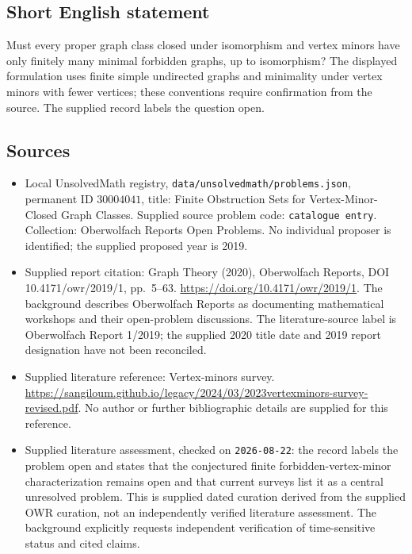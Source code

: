 \documentclass[11pt]{article}
\begin{document}
\subsection{Short English statement}
Must every proper graph class closed under isomorphism and vertex minors have only finitely many minimal forbidden graphs, up to isomorphism? The displayed formulation uses finite simple undirected graphs and minimality under vertex minors with fewer vertices; these conventions require confirmation from the source. The supplied record labels the question open.
\subsection{Sources}
\begin{itemize}
\item Local UnsolvedMath registry, \texttt{data/unsolvedmath/problems.json}, permanent ID \(30004041\), title: Finite Obstruction Sets for Vertex-Minor-Closed Graph Classes. Supplied source problem code: \texttt{catalogue entry}. Collection: Oberwolfach Reports Open Problems. No individual proposer is identified; the supplied proposed year is 2019.
\item Supplied report citation: Graph Theory (2020), Oberwolfach Reports, DOI 10.4171/owr/2019/1, pp.\ 5--63. \url{https://doi.org/10.4171/owr/2019/1}. The background describes Oberwolfach Reports as documenting mathematical workshops and their open-problem discussions. The literature-source label is Oberwolfach Report 1/2019; the supplied 2020 title date and 2019 report designation have not been reconciled.
\item Supplied literature reference: Vertex-minors survey. \url{https://sangiloum.github.io/legacy/2024/03/2023vertexminors-survey-revised.pdf}. No author or further bibliographic details are supplied for this reference.
\item Supplied literature assessment, checked on \texttt{2026-08-22}: the record labels the problem open and states that the conjectured finite forbidden-vertex-minor characterization remains open and that current surveys list it as a central unresolved problem. This is supplied dated curation derived from the supplied OWR curation, not an independently verified literature assessment. The background explicitly requests independent verification of time-sensitive status and cited claims.
\end{itemize}
\end{document}
